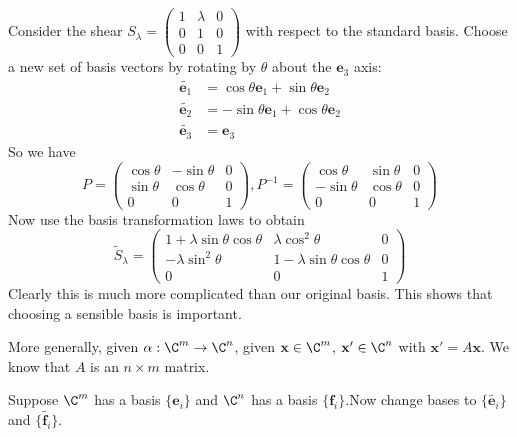 \documentclass[a4paper]{article}
\begin{document}
      \begin{eg}
        Consider the shear $S_\lambda = 
        \begin{pmatrix}
          1 & \lambda & 0\\
          0 & 1 & 0\\
          0 & 0 & 1
        \end{pmatrix}$ with respect to the standard basis. Choose a new set of basis vectors by rotating by $\theta$ about the $\mathbf{e}_3$ axis:
        \begin{align*}
          \tilde{\mathbf{e}_1} &= \cos\theta \mathbf{e}_1 + \sin\theta \mathbf{e}_2\\
          \tilde{\mathbf{e}_2} &= -\sin\theta \mathbf{e}_1 + \cos\theta \mathbf{e}_2\\
          \tilde{\mathbf{e}_3} &= \mathbf{e}_3
        \end{align*}
        So we have
        \[
          P = 
          \begin{pmatrix}
            \cos\theta  & -\sin\theta & 0\\
            \sin\theta & \cos\theta & 0\\
            0 & 0 & 1
          \end{pmatrix}, P^{-1} = 
          \begin{pmatrix}
            \cos\theta  & \sin\theta & 0\\
            -\sin\theta & \cos\theta & 0\\
            0 & 0 & 1
          \end{pmatrix}
        \]
        Now use the basis transformation laws to obtain
        \[
          \tilde{S}_\lambda = 
          \begin{pmatrix}
            1 + \lambda\sin\theta\cos\theta & \lambda \cos^2\theta & 0\\
            -\lambda \sin^2\theta & 1 - \lambda\sin\theta\cos\theta & 0\\
            0 & 0 & 1
          \end{pmatrix}
        \]
        Clearly this is much more complicated than our original basis. This shows that choosing a sensible basis is important. 
      \end{eg}

      More generally, given $\alpha: \C^m \to \C^n$, given $\mathbf{x}\in \C^m$, $\mathbf{x}'\in \C^n$ with $\mathbf{x}' = A\mathbf{x}$. We know that $A$ is an $n\times m$ matrix.

      Suppose $\C^m$ has a basis $\{\mathbf{e}_i\}$ and $\C^n$ has a basis $\{\mathbf{f}_i\}$.Now change bases to $\{\tilde{\mathbf{e}_i}\}$ and $\{\tilde{\mathbf{f}_i}\}$.
\end{document}

